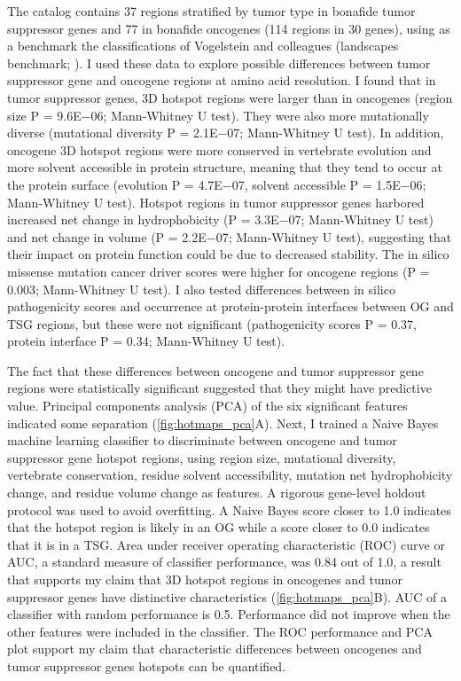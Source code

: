 The catalog contains 37 regions stratified by tumor type in bonafide tumor suppressor genes and 77 in bonafide oncogenes (114 regions in 30 genes), using as a benchmark the classifications of Vogelstein and colleagues (landscapes benchmark; \cite{RN25}). I used these data to explore possible differences between tumor suppressor gene and oncogene regions at amino acid resolution. I found that in tumor suppressor genes, 3D hotspot regions were larger than in oncogenes (region size P = 9.6E−06; Mann-Whitney U test). They were also more mutationally diverse (mutational diversity P = 2.1E−07; Mann-Whitney U test). In addition, oncogene 3D hotspot regions were more conserved in vertebrate evolution and more solvent accessible in protein structure, meaning that they tend to occur at the protein surface (evolution P = 4.7E−07, solvent accessible P = 1.5E−06; Mann-Whitney U test). Hotspot regions in tumor suppressor genes harbored increased net change in hydrophobicity (P = 3.3E−07; Mann-Whitney U test) and net change in volume (P = 2.2E−07; Mann-Whitney U test), suggesting that their impact on protein function could be due to decreased stability. The in silico missense mutation cancer driver scores were higher for oncogene regions (P = 0.003; Mann-Whitney U test). I also tested differences between in silico pathogenicity scores and occurrence at protein-protein interfaces between OG and TSG regions, but these were not significant (pathogenicity scores P = 0.37, protein interface P = 0.34; Mann-Whitney U test).

The fact that these differences between oncogene and tumor suppressor gene regions were statistically significant suggested that they might have predictive value. Principal components analysis (PCA) of the six significant features indicated some separation (\autoref{fig:hotmaps_pca}A). Next, I trained a Naive Bayes machine learning classifier to discriminate between oncogene and tumor suppressor gene hotspot regions, using region size, mutational diversity, vertebrate conservation, residue solvent accessibility, mutation net hydrophobicity change, and residue volume change as features. A rigorous gene-level holdout protocol was used to avoid overfitting. A Naive Bayes score closer to 1.0 indicates that the hotspot region is likely in an OG while a score closer to 0.0 indicates that it is in a TSG. Area under receiver operating characteristic (ROC) curve or AUC, a standard measure of classifier performance, was 0.84 out of 1.0, a result that supports my claim that 3D hotspot regions in oncogenes and tumor suppressor genes have distinctive characteristics (\autoref{fig:hotmaps_pca}B). AUC of a classifier with random performance is 0.5. Performance did not improve when the other features were included in the classifier. The ROC performance and PCA plot support my claim that characteristic differences between oncogenes and tumor suppressor genes hotspots can be quantified. 

